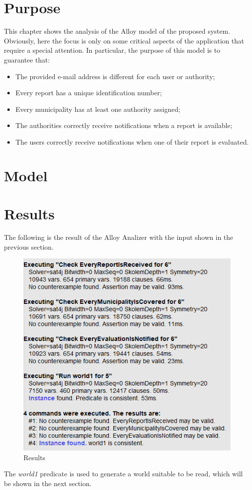 \documentclass[12pt,a4paper]{report}
\begin{document}
	\section{Purpose}
This chapter shows the analysis of the Alloy model of the proposed system. Obviously, here the focus is only on some critical aspects of the application that require a special attention. In particular, the purpose of this model is to guarantee that:
\begin{itemize}
	\item The provided e-mail address is different for each user or authority;
	\item Every report has a unique identification number;
	\item Every municipality has at least one authority assigned;
	\item The authorities correctly receive notifications when a report is available;
	\item The users correctly receive notifications when one of their report is evaluated.
\end{itemize}

\newpage
	\section{Model}

	

	\newpage

	\section{Results}
	The following is the result of the Alloy Analizer with the input shown in the previous section. 
		\begin{figure}[H]
				\includegraphics[scale = 0.9, center]{Consistency}
				\caption{Results}
		\end{figure}
	The \emph{world1} predicate is used to generate a world suitable to be read, which will be shown in the next section.
	
\end{document}
